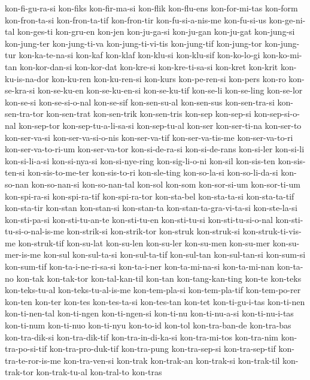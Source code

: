 {kon-fi-gu-ra-si kon-fiks kon-fir-ma-si kon-flik kon-flu-ens kon-for-mi-tas
kon-form kon-fron-ta-si kon-fron-ta-tif kon-fron-tir kon-fu-si-a-nis-me
kon-fu-si-us kon-ge-ni-tal kon-ges-ti kon-gru-en kon-jen kon-ju-ga-si
kon-ju-gan kon-ju-gat kon-jung-si kon-jung-ter kon-jung-ti-va
kon-jung-ti-vi-tis kon-jung-tif kon-jung-tor kon-jung-tur kon-ka-te-na-si
kon-kaf kon-klaf kon-klu-si kon-klu-sif kon-ko-lo-gi kon-ko-mi-tan
kon-kor-dan-si kon-kor-dat kon-kre-si kon-kre-ti-sa-si kon-kret kon-krit
kon-ku-is-na-dor kon-ku-ren kon-ku-ren-si kon-kurs kon-pe-ren-si kon-pers
kon-ro kon-se-kra-si kon-se-ku-en kon-se-ku-en-si kon-se-ku-tif kon-se-li
kon-se-ling kon-se-lor kon-se-si kon-se-si-o-nal kon-se-sif kon-sen-su-al
kon-sen-sus kon-sen-tra-si kon-sen-tra-tor kon-sen-trat kon-sen-trik
kon-sen-tris kon-sep kon-sep-si kon-sep-si-o-nal kon-sep-tor
kon-sep-tu-a-li-sa-si kon-sep-tu-al kon-ser kon-ser-ti-na kon-ser-to
kon-ser-va-si kon-ser-va-si-o-nis kon-ser-va-tif kon-ser-va-tis-me
kon-ser-va-to-ri kon-ser-va-to-ri-um kon-ser-va-tor kon-si-de-ra-si
kon-si-de-rans kon-si-ler kon-si-li kon-si-li-a-si kon-si-nya-si
kon-si-nye-ring kon-sig-li-o-ni kon-sil kon-sis-ten kon-sis-ten-si
kon-sis-to-me-ter kon-sis-to-ri kon-sle-ting kon-so-la-si kon-so-li-da-si
kon-so-nan kon-so-nan-si kon-so-nan-tal kon-sol kon-som kon-sor-si-um
kon-sor-ti-um kon-spi-ra-si kon-spi-ra-tif kon-spi-ra-tor kon-sta-bel
kon-sta-ta-si kon-sta-ta-tif kon-sta-tir kon-stan kon-stan-si kon-stan-ta
kon-stan-ta-gra-vi-ta-si kon-ste-la-si kon-sti-pa-si kon-sti-tu-an-te
kon-sti-tu-en kon-sti-tu-si kon-sti-tu-si-o-nal kon-sti-tu-si-o-nal-is-me
kon-strik-si kon-strik-tor kon-struk kon-struk-si kon-struk-ti-vis-me
kon-struk-tif kon-su-lat kon-su-len kon-su-ler kon-su-men kon-su-mer
kon-su-mer-is-me kon-sul kon-sul-ta-si kon-sul-ta-tif kon-sul-tan
kon-sul-tan-si kon-sum-si kon-sum-tif kon-ta-i-ne-ri-sa-si kon-ta-i-ner
kon-ta-mi-na-si kon-ta-mi-nan kon-ta-no kon-tak kon-tak-tor
kon-tal-kan-til kon-tan kon-tang-kan-ting kon-te kon-teks kon-teks-tu-al
kon-teks-tu-al-is-me kon-tem-pla-si kon-tem-pla-tif kon-tem-po-rer kon-ten
kon-ter kon-tes kon-tes-ta-si kon-tes-tan kon-tet kon-ti-gu-i-tas
kon-ti-nen kon-ti-nen-tal kon-ti-ngen kon-ti-ngen-si kon-ti-nu
kon-ti-nu-a-si kon-ti-nu-i-tas kon-ti-num kon-ti-nuo kon-ti-nyu kon-to-id
kon-tol kon-tra-ban-de kon-tra-bas kon-tra-dik-si kon-tra-dik-tif
kon-tra-in-di-ka-si kon-tra-mi-tos kon-tra-nim kon-tra-po-si-tif
kon-tra-pro-duk-tif kon-tra-pung kon-tra-sep-si kon-tra-sep-tif
kon-tra-te-ror-is-me kon-tra-ven-si kon-trak kon-trak-an kon-trak-si
kon-trak-til kon-trak-tor kon-trak-tu-al kon-tral-to kon-tras
}

